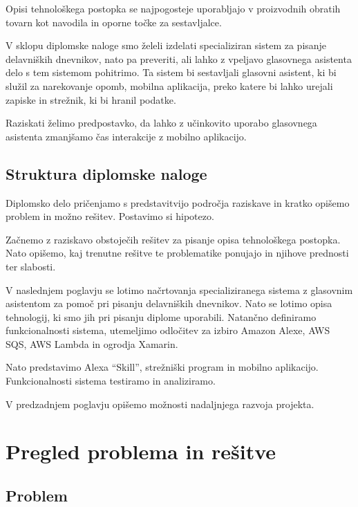 \documentclass[a4paper, 12pt]{book}
\begin{document}
Opisi tehnološkega postopka se najpogosteje uporabljajo v proizvodnih obratih tovarn kot navodila in oporne točke za sestavljalce.

V sklopu diplomske naloge smo želeli izdelati specializiran sistem za pisanje delavniških dnevnikov, nato pa preveriti, ali lahko z vpeljavo glasovnega asistenta delo s tem sistemom pohitrimo.
Ta sistem bi sestavljali glasovni asistent, ki bi služil za narekovanje opomb, mobilna aplikacija, preko katere bi lahko urejali zapiske in strežnik, ki bi hranil podatke.

Raziskati želimo predpostavko, da lahko z učinkovito uporabo glasovnega asistenta zmanjšamo čas interakcije z mobilno aplikacijo.


\section{Struktura diplomske naloge}

Diplomsko delo pričenjamo s predstavitvijo področja raziskave in kratko opišemo problem in možno rešitev. 
Postavimo si hipotezo.

Začnemo z raziskavo obstoječih rešitev za pisanje opisa tehnološkega postopka.
Nato opišemo, kaj trenutne rešitve te problematike ponujajo in njihove prednosti ter slabosti.

V naslednjem poglavju se lotimo načrtovanja specializiranega sistema z glasovnim asistentom za pomoč pri pisanju delavniških dnevnikov.
Nato se lotimo opisa tehnologij, ki smo jih pri pisanju diplome uporabili.
Natančno definiramo funkcionalnosti sistema, utemeljimo odločitev za izbiro Amazon Alexe, AWS SQS, AWS Lambda in ogrodja Xamarin.

Nato predstavimo Alexa \enquote{Skill}, strežniški program in mobilno aplikacijo.
Funkcionalnosti sistema testiramo in analiziramo.

V predzadnjem poglavju opišemo možnosti nadaljnjega razvoja projekta.

\chapter{Pregled problema in rešitve}

\section{Problem}
\end{document}
